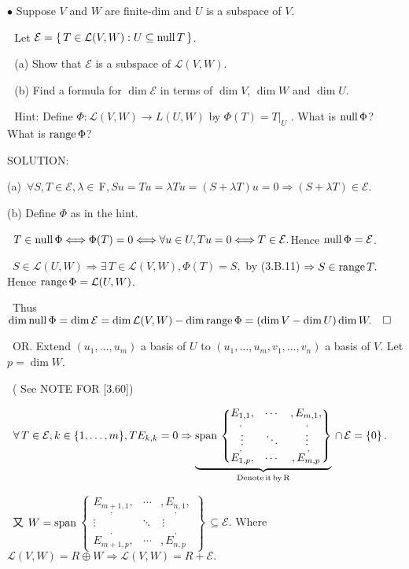 \documentclass[a4paper, 11pt, UTF8]{article}
\def\range{\textup{range}\,}
\def\null{\textup{null\,}}
\def\Spn{\textup{span}\,}
\def\Lm{\mathcal{L}}
\def\Fbfc{$\,{\timesbf F}$}
\begin{document}
\begin{large}
{\small $\bullet$} {\timessl\Large 
Suppose $V$ and $W$ are finite-dim and $U$ is a subspace of $V$.}\par\,\,
{\timessl\Large Let $\mathcal{E} = \{\,T\in\Lm(V, W): U\subseteq\null T\,\}$.}\par\,\,
(a) {\timessl\Large Show that $\mathcal{E}$ is a subspace of $\Lm(V, W)$.}\par\,\,
(b) {\timessl\Large Find a formula for $\dim \mathcal{E}$ in terms of $\dim V$, $\dim W$ and $\dim U$.}\par\,\,
{\timessl\normalsize
Hint: Define $\Phi:\Lm(V, W)\rightarrow L(U, W)$ by $\Phi(T) = T|_U$ . What is $\null\Phi$?
What is $\range\Phi$?
}\par
{\timesbf S\footnotesize{OLUTION:}}\par\quad
(a) \,$\forall S,T\in\mathcal{E},\lambda\in\Fbfc,Su=Tu=\lambda Tu=(S+\lambda T)u=0\Rightarrow(S+\lambda T)\in\mathcal{E}.$\par\quad
(b) Define $\Phi$ as in the hint.\par\qquad\,
$T\in\null\Phi\Longleftrightarrow\Phi(T)=0\Longleftrightarrow\forall u\in U,Tu=0\Longleftrightarrow T\in\mathcal{E}.$\qquad\qquad\qquad Hence $\null\Phi=\mathcal{E}$.\par\qquad\,
$S\in\Lm(U,W)\Rightarrow\exists\,T\in\Lm(V,W),\Phi(T)=S,$ by (3.B.11) $\Rightarrow S\in\range T.\,$\quad Hence $\range\Phi=\Lm(U,W)$.\par\qquad\,
Thus $\dim\null\Phi=\dim\mathcal{E}=\dim\Lm(V,W)-\dim\range\Phi=(\dim V-\dim U)\dim W.\quad\square$%
\par\qquad\,
O{\small R}. Extend $(u_1,\dots,u_m)$ a basis of $U$ to $(u_1,\dots,u_m,v_1,\dots,v_n)$ a basis of $V$. Let $p=\dim W$.\par\qquad\,
( See N{\small OTE} F{\small OR} [3.60])\par\qquad\,
$\forall \,T\in\mathcal{E},k\in\{1,\dots,m\},TE_{k,k}=0\Rightarrow\underbrace{\Spn\begin{Bmatrix} \underset{,}{E_{1,1}}, & \cdots & ,\underset{,}{E_{m,1}},\\ \vdots & \ddots & \,\vdots\\ \overset{,}{E_{1,p}}, & \cdots & ,\overset{,}{E_{m,p}}\end{Bmatrix}}_{\textup{Denote\,it\,by\,R}}\,\cap\,\mathcal{E}=\{0\}$.\par\qquad\,
又 $W=\Spn${\footnotesize$\begin{Bmatrix} \underset{,}{E_{m+1,1}}, & \cdots & ,\underset{,}{E_{n,1}},\\ \vdots & \ddots & \,\vdots\\ \overset{,}{E_{m+1,p}}, & \cdots & ,\overset{,}{E_{n,p}}\end{Bmatrix}$}$\,\subseteq\mathcal{E}$. Where $\Lm(V,W)=R\oplus W\Rightarrow\Lm(V,W)=R+\mathcal{E}.$\par\qquad\,

\end{large}
\end{document}
